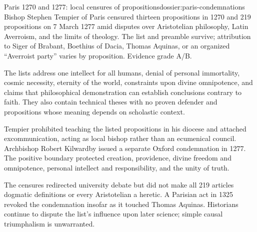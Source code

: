 \begin{heresydossier}{Paris 1270 and 1277: local censures of propositions}{dossier:paris-condemnations}
\objectfield Bishop Stephen Tempier of Paris censured thirteen propositions in 1270 and 219 propositions on 7 March 1277 amid disputes over Aristotelian philosophy, Latin Averroism, and the limits of theology. The list and preamble survive; attribution to Siger of Brabant, Boethius of Dacia, Thomas Aquinas, or an organized ``Averroist party'' varies by proposition. Evidence grade A/B.

\propositionfield The lists address one intellect for all humans, denial of personal immortality, cosmic necessity, eternity of the world, constraints upon divine omnipotence, and claims that philosophical demonstration can establish conclusions contrary to faith. They also contain technical theses with no proven defender and propositions whose meaning depends on scholastic context.

\responsefield Tempier prohibited teaching the listed propositions in his diocese and attached excommunication, acting as local bishop rather than an ecumenical council. Archbishop Robert Kilwardby issued a separate Oxford condemnation in 1277. The positive boundary protected creation, providence, divine freedom and omnipotence, personal intellect and responsibility, and the unity of truth.

\aftermathfield The censures redirected university debate but did not make all 219 articles dogmatic definitions or every Aristotelian a heretic. A Parisian act in 1325 revoked the condemnation insofar as it touched Thomas Aquinas. Historians continue to dispute the list's influence upon later science; simple causal triumphalism is unwarranted.
\end{heresydossier}

